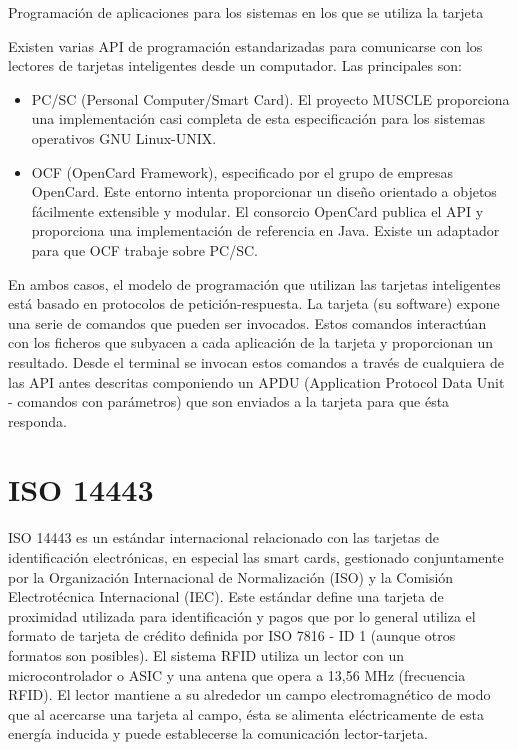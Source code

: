\bigskip
Programación de aplicaciones para los sistemas en los que se utiliza la tarjeta

\bigskip
Existen varias API de programación estandarizadas para comunicarse con los lectores de tarjetas inteligentes desde un computador. Las principales son:

\begin{itemize}
\item PC/SC (Personal Computer/Smart Card). El proyecto MUSCLE proporciona una implementación casi completa de esta especificación para los sistemas operativos GNU Linux-UNIX. 
\item OCF (OpenCard Framework), especificado por el grupo de empresas OpenCard. Este entorno intenta proporcionar un diseño orientado a objetos fácilmente extensible y modular. El consorcio OpenCard publica el API y proporciona una implementación de referencia en Java. Existe un adaptador para que OCF trabaje sobre PC/SC. 
\end{itemize}


En ambos casos, el modelo de programación que utilizan las tarjetas inteligentes está basado en protocolos de petición-respuesta. La tarjeta (su software) expone una serie de comandos que pueden ser invocados. Estos comandos interactúan con los ficheros que subyacen a cada aplicación de la tarjeta y proporcionan un resultado. Desde el terminal se invocan estos comandos a través de cualquiera de las API antes descritas componiendo un APDU (Application Protocol Data Unit - comandos con parámetros) que son enviados a la tarjeta para que ésta responda.


\section{ISO 14443}

ISO 14443 es un estándar internacional relacionado con las tarjetas de identificación electrónicas, en especial las smart cards, gestionado conjuntamente por la Organización Internacional de Normalización (ISO) y la Comisión Electrotécnica Internacional (IEC).
Este estándar define una tarjeta de proximidad utilizada para identificación y pagos que por lo general utiliza el formato de tarjeta de crédito definida por ISO 7816 - ID 1 (aunque otros formatos son posibles).
El sistema RFID utiliza un lector con un microcontrolador o ASIC y una antena que opera a 13,56 MHz (frecuencia RFID). El lector mantiene a su alrededor un campo electromagnético de modo que al acercarse una tarjeta al campo, ésta se alimenta eléctricamente de esta energía inducida y puede establecerse la comunicación lector-tarjeta.

